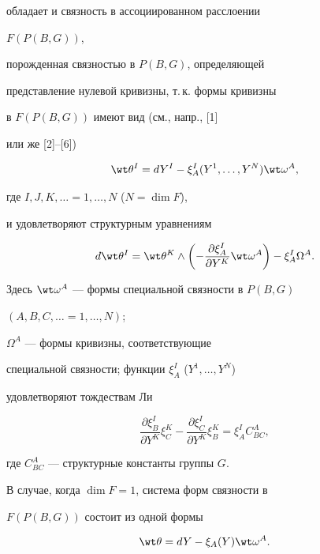 обладает и связность в ассоциированном расслоении


$F({P ({B,G})})$,


порожденная связностью в $P ({B,G})$, определяющей 


представление нулевой кривизны, т.\,к. формы кривизны


в $F ({P ({B,G})})$ имеют вид (см., напр., [1] 


или же [2]--[6])


\begin{equation}


\wt \theta{}^I=dY^I-\xi_A^I ({Y^1, \dotsc,Y^N})


\wt \omega^A,


\end{equation}


где $I,J,K, \dotsc=1, \dotsc,N$ (${N=\dim F}$), 


и удовлетворяют структурным уравнениям


$$


d\wt \theta{}^I=\wt \theta{}^K \wedge \bigg(


{-\frac{{\partial \xi_A^I}}{{\partial Y^K}}\wt \omega{}^A}\bigg) -


\xi_A^I \Omega^A.


$$


Здесь $\wt \omega^A$ --- формы специальной связности в $P ({B,G})$


$(A,B,C, \dotsc=1, \dotsc,N)$;


$\Omega^A$ --- формы кривизны, соответствующие


специальной связности; функции $\xi_A^I$ (${Y^1, \dotsc,Y^N}$)


удовлетворяют тождествам Ли


\begin{equation}


\frac{{\partial \xi_B^I}}{{\partial Y^K}}\xi_C^K -


\frac{{\partial \xi_C^I}}{{\partial Y^K}}\xi_B^K=\xi_A^I C_{BC}^A,


\end{equation}


где $C_{BC}^A$ --- структурные константы группы $G$.


В случае, когда $\dim F=1$, система форм связности в


$F ({P ({B,G})})$ состоит из одной формы


\begin{equation}


\wt \theta=dY-\xi_A (Y) \wt \omega{}^A.


\end{equation}





